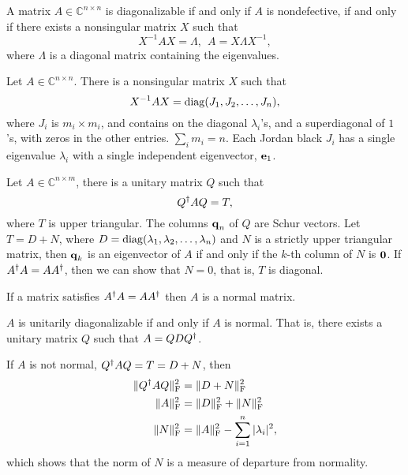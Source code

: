 \documentclass{article}
\begin{document}
\begin{definition}[Diagonizability]
A matrix $A\in\mathbb{C}^{n\times n}$ is diagonalizable if and only if $A$ is nondefective, if and only if there exists a nonsingular matrix $X$ such that
\begin{equation}
    X^{-1}AX=\Lambda,\ \ A=X\Lambda X^{-1},
\end{equation}
where $\Lambda$ is a diagonal matrix containing the eigenvalues.
\end{definition}

\begin{definition}
    Let $A\in\mathbb{C}^{n\times n}$. There is a nonsingular matrix $X$ such that
    \begin{equation}
        X^{-1} AX=\operatorname{diag}(J_1,J_2,\dots,J_n),
    \end{equation}
    where $J_i$ is $m_i\times m_i$, and contains on the diagonal $\lambda_i$'s, and a superdiagonal of $1$'s, with zeros in the other entries. $\sum_im_i=n$. Each Jordan black $J_i$ has a single eigenvalue $\lambda_i$ with a single independent eigenvector, $\bm{\mathrm{e}}_1$.
\end{definition}

\begin{definition}
    Let $A\in\mathbb{C}^{n\times m}$, there is a unitary matrix $Q$ such that
    \begin{equation}
        Q^{\dagger} AQ=T,
    \end{equation}
    where $T$ is upper triangular. The columns $\bm{\mathrm{q}}_n$ of $Q$ are Schur vectors. Let $T=D+N$, where $D=\operatorname{diag}(\lambda_1,\lambda_2,\dots,\lambda_n)$ and $N$ is a strictly upper triangular matrix, then $\bm{\mathrm{q}}_k$ is an eigenvector of $A$ if and only if the $k$-th column of $N$ is $\bm{\mathrm{0}}$. If $A^{\dagger} A=AA^{\dagger}$, then we can show that $N=0$, that is, $T$ is diagonal.
\end{definition}

\begin{definition}
    If a matrix satisfies $A^{\dagger} A=AA^{\dagger}$ then $A$ is a normal matrix.
\end{definition}

\begin{theorem}
    $A$ is unitarily diagonalizable if and only if $A$ is normal. That is, there exists a unitary matrix $Q$ such that $A=QDQ^{\dagger}$.
\end{theorem}
If $A$ is not normal, $Q^{\dagger} AQ=T=D+N$, then
\begin{align}
    \lVert Q^{\dagger} AQ\rVert_{\mathrm{F}}^2&=\lVert D+N \rVert_{\mathrm{F}}^2\\
    \lVert A\rVert_{\mathrm{F}}^2&=\lVert D\rVert_{\mathrm{F}}^2+\lVert N\rVert_{\mathrm{F}}^2\\
    \lVert N\rVert_{\mathrm{F}}^2&=\lVert A\rVert_{\mathrm{F}}^2-\sum_{i=1}^n|\lambda_i|^2,
\end{align}
which shows that the norm of $N$ is a measure of departure from normality.
\end{document}
